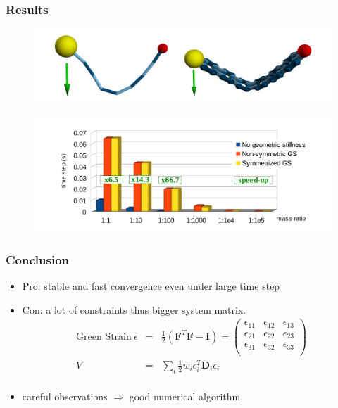 \documentclass[serif,mathserif]{beamer}
\newcommand{\BOLD}[1]{\mathbf{#1}}
\begin{document}
\begin{frame}
 \frametitle{Results}
 \begin{figure}
  \centering
  \includegraphics[scale=0.25]{img/cables.png}
 \end{figure}
 \begin{figure}
  \centering
  \includegraphics[scale=0.25]{img/statistics.png}
 \end{figure}
\end{frame}

\begin{frame}
 \frametitle{Conclusion}
 \begin{itemize}
  \item Pro: stable and fast convergence even under large time step
  \item Con: a lot of constraints thus bigger system matrix.
  \begin{eqnarray*}
    \text{Green Strain} ~\epsilon&=&\frac{1}{2}(\BOLD{F}^T\BOLD{F}-\BOLD{I})=
    \begin{pmatrix}
     \epsilon_{11} & \epsilon_{12} & \epsilon_{13} \\
     \epsilon_{21} & \epsilon_{22} & \epsilon_{23} \\
     \epsilon_{31} & \epsilon_{32} & \epsilon_{33} \\
    \end{pmatrix} \\
   V &=& \sum_i \frac{1}{2}w_i\epsilon_i^T\BOLD{D}_i\epsilon_i \\
  \end{eqnarray*}
  \item careful observations $\Rightarrow$ good numerical algorithm
 \end{itemize}
\end{frame}

\begin{frame} 
\end{frame}
\end{document}
